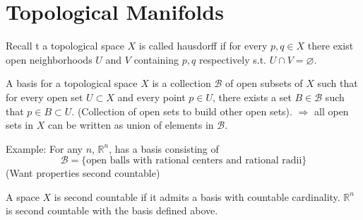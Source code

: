 \documentclass[a4paper]{article}
\begin{document}
\section*{Topological Manifolds}
Recall t a topological space $X$ is called hausdorff if for every $p,q \in X$ there exist open neighborhoods $U$ and $V$ containing $p,q$ respectively s.t. $U \cap V = \varnothing$.

A basis for a topological space $X$ is a collection $\mathcal{B}$ of open subsets of $X$ such that for  every open set $U \subset X$ and every point $p \in U$, there exists a set $B \in \mathcal{B}$ such that $p \in B \subset U$. (Collection of open sets to build other open sets). $\Rightarrow$ all open sets in $X$ can be written as union of elements in $\mathcal{B}$.

Example: For any $n$, $\mathds{R}^n$, has a basis consisting of 
\[
    \mathcal{B} = \{\text{open balls with rational centers and rational radii}\}
\]
(Want properties second countable)

A space $X$ is second countable if it admits a basis with countable cardinality. $\mathds{R}^n$ is second countable with the basis defined above.
\end{document}

